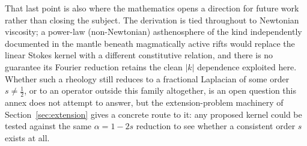 \documentclass{article}
\begin{document}
That last point is also where the mathematics opens a direction for
future work rather than closing the subject. The derivation is tied
throughout to Newtonian viscosity; a power-law (non-Newtonian) asthenosphere
of the kind independently documented in the mantle beneath magmatically
active rifts would replace the linear Stokes kernel with a different
constitutive relation, and there is no guarantee its Fourier reduction
retains the clean $|k|$ dependence exploited here. Whether such a rheology
still reduces to a fractional Laplacian of some order $s\neq\tfrac12$, or to
an operator outside this family altogether, is an open question this annex
does not attempt to answer, but the extension-problem machinery of
Section~\ref{sec:extension} gives a concrete route to it: any proposed
kernel could be tested against the same $\alpha=1-2s$ reduction to see
whether a consistent order $s$ exists at all.



\end{document}
